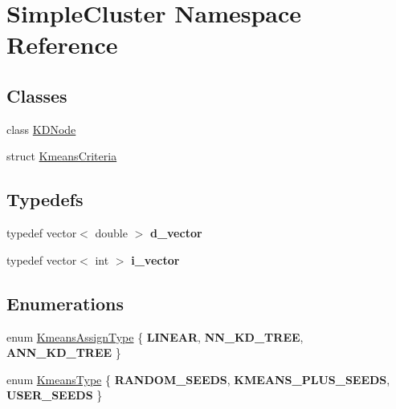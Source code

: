 \hypertarget{namespaceSimpleCluster}{\section{Simple\+Cluster Namespace Reference}
\label{namespaceSimpleCluster}
}
\subsection*{Classes}
\begin{DoxyCompactItemize}
\item 
class \hyperlink{classSimpleCluster_1_1KDNode}{K\+D\+Node}
\item 
struct \hyperlink{structSimpleCluster_1_1KmeansCriteria}{Kmeans\+Criteria}
\end{DoxyCompactItemize}
\subsection*{Typedefs}
\begin{DoxyCompactItemize}
\item 
\hypertarget{namespaceSimpleCluster_a2c39f662ef8ab290b2a0613dbc3b4c4e}{typedef vector$<$ double $>$ {\bfseries d\+\_\+vector}}\label{namespaceSimpleCluster_a2c39f662ef8ab290b2a0613dbc3b4c4e}

\item 
\hypertarget{namespaceSimpleCluster_ab17abba17860f283d1defd90861cb798}{typedef vector$<$ int $>$ {\bfseries i\+\_\+vector}}\label{namespaceSimpleCluster_ab17abba17860f283d1defd90861cb798}

\end{DoxyCompactItemize}
\subsection*{Enumerations}
\begin{DoxyCompactItemize}
\item 
enum \hyperlink{namespaceSimpleCluster_a1ad2d6129171ff9a5ee57f48b5f3f6e1}{Kmeans\+Assign\+Type} \{ {\bfseries L\+I\+N\+E\+A\+R}, 
{\bfseries N\+N\+\_\+\+K\+D\+\_\+\+T\+R\+E\+E}, 
{\bfseries A\+N\+N\+\_\+\+K\+D\+\_\+\+T\+R\+E\+E}
 \}
\item 
enum \hyperlink{namespaceSimpleCluster_a8a8f57121b69a7b43575e4d6a53928e2}{Kmeans\+Type} \{ {\bfseries R\+A\+N\+D\+O\+M\+\_\+\+S\+E\+E\+D\+S}, 
{\bfseries K\+M\+E\+A\+N\+S\+\_\+\+P\+L\+U\+S\+\_\+\+S\+E\+E\+D\+S}, 
{\bfseries U\+S\+E\+R\+\_\+\+S\+E\+E\+D\+S}
 \}
\end{DoxyCompactItemize}
